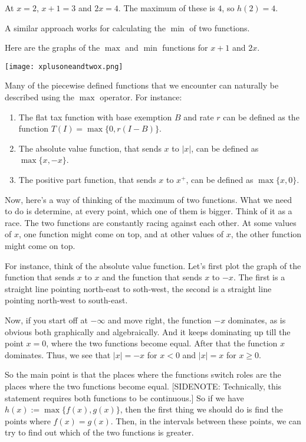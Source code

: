 \documentclass{amsart}
\begin{document}
At $x = 2$, $x + 1 = 3$ and $2x = 4$. The maximum of these is $4$, so
$h(2) = 4$.

A similar approach works for calculating the $\min$ of two functions.

Here are the graphs of the $\max$ and $\min$ functions for $x + 1$ and
$2x$.

\texttt{[image: xplusoneandtwox.png]}

Many of the piecewise defined functions that we encounter can
naturally be described using the $\max$ operator. For instance:

\begin{enumerate}

\item The flat tax function with base exemption $B$ and rate $r$ can
  be defined as the function $T(I) = \max \{ 0, r(I - B) \}$.

\item The absolute value function, that sends $x$ to $|x|$, can be
  defined as $\max \{ x, -x \}$.

\item The positive part function, that sends $x$ to $x^+$, can be
  defined as $\max \{ x, 0 \}$.
\end{enumerate}

Now, here's a way of thinking of the maximum of two functions. What we
need to do is determine, at every point, which one of them is
bigger. Think of it as a race. The two functions are constantly racing
against each other. At some values of $x$, one function might come on
top, and at other values of $x$, the other function might come on top.

For instance, think of the absolute value function. Let's first plot
the graph of the function that sends $x$ to $x$ and the function that
sends $x$ to $-x$. The first is a straight line pointing north-east to
soth-west, the second is a straight line pointing north-west to
south-east.

Now, if you start off at $-\infty$ and move right, the function $-x$
dominates, as is obvious both graphically and algebraically. And it
keeps dominating up till the point $x = 0$, where the two functions
become equal. After that the function $x$ dominates. Thus, we see that
$|x| = -x$ for $x < 0$ and $|x| = x$ for $x \ge 0$.

So the main point is that the places where the functions switch roles
are the places where the two functions become equal. [SIDENOTE:
Technically, this statement requires both functions to be continuous.]
So if we have $h(x) := \max \{ f(x),g(x) \}$, then the first thing we
should do is find the points where $f(x) = g(x)$. Then, in the
intervals between these points, we can try to find out which of the
two functions is greater.
\end{document}
